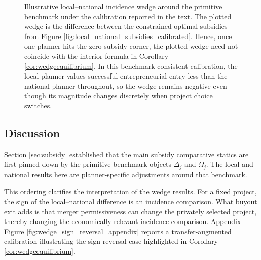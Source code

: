 \begin{figure}[t]
\centering
{}
\caption{Illustrative local--national incidence wedge around the primitive benchmark under the calibration reported in the text. The plotted wedge is the difference between the constrained optimal subsidies from Figure \ref{fig:local_national_subsidies_calibrated}. Hence, once one planner hits the zero-subsidy corner, the plotted wedge need not coincide with the interior formula in Corollary \ref{cor:wedgeequilibrium}. In this benchmark-consistent calibration, the local planner values successful entrepreneurial entry less than the national planner throughout, so the wedge remains negative even though its magnitude changes discretely when project choice switches.}
\label{fig:wedge_calibrated}
\end{figure}

\subsection{Discussion}

Section \ref{sec:subsidy} established that the main subsidy comparative statics are first pinned down by the primitive benchmark objects $\Delta_j$ and $\Omega_j$. The local and national results here are planner-specific adjustments around that benchmark.

This ordering clarifies the interpretation of the wedge results. For a fixed project, the sign of the local--national difference is an incidence comparison. What buyout exit adds is that merger permissiveness can change the privately selected project, thereby changing the economically relevant incidence comparison. Appendix Figure \ref{fig:wedge_sign_reversal_appendix} reports a transfer-augmented calibration illustrating the sign-reversal case highlighted in Corollary \ref{cor:wedgeequilibrium}.
